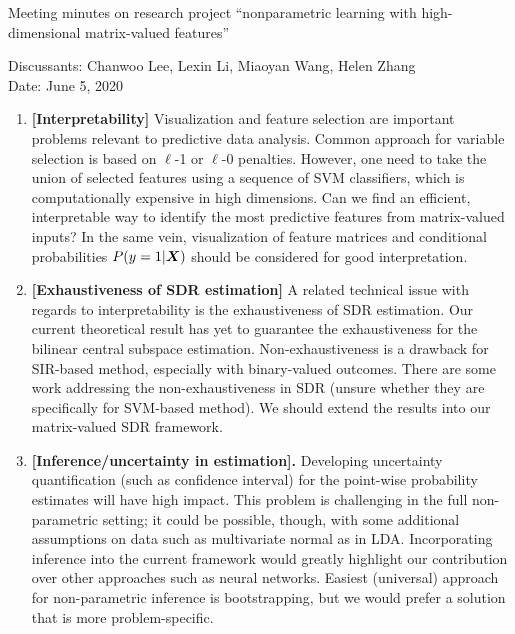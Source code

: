 \documentclass[11pt]{article}
\theoremstyle{plain}
\theoremstyle{definition}
\begin{document}
\begin{center}
{\Large Meeting minutes on research project ``nonparametric learning with high-dimensional matrix-valued features''}

Discussants: Chanwoo Lee, Lexin Li, Miaoyan Wang, Helen Zhang\\
Date: June 5, 2020
\end{center}

\begin{enumerate}
\item[] {\bf [Interpretability]} Visualization and feature selection are important problems relevant to predictive data analysis. Common approach for variable selection is based on $\ell$-1 or $\ell$-0 penalties. However, one need to take the union of selected features using a sequence of SVM classifiers, which is computationally expensive in high dimensions. Can we find an efficient, interpretable way to identify the most predictive features from matrix-valued inputs? In the same vein, visualization of feature matrices and conditional probabilities $P(y =1 |\bm X)$ should be considered for good interpretation.

\item[] {\bf [Exhaustiveness of SDR estimation]} A related technical issue with regards to interpretability is the exhaustiveness of SDR estimation. Our current theoretical result has yet to guarantee the exhaustiveness for the bilinear central subspace estimation. Non-exhaustiveness is a drawback for SIR-based method, especially with binary-valued outcomes. There are some work addressing the non-exhaustiveness in SDR (unsure whether they are specifically for SVM-based method). We should extend the results into our matrix-valued SDR framework. 

 
\item[] {\bf [Inference/uncertainty in estimation].} Developing uncertainty quantification (such as confidence interval) for the point-wise probability estimates will have high impact. This problem is challenging in the full non-parametric setting; it could be possible, though, with some additional assumptions on data such as multivariate normal as in LDA. Incorporating inference into the current framework would greatly highlight our contribution over other approaches such as neural networks. Easiest (universal) approach for non-parametric inference is bootstrapping, but we would prefer a solution that is more problem-specific.



\end{enumerate}
\end{document}
